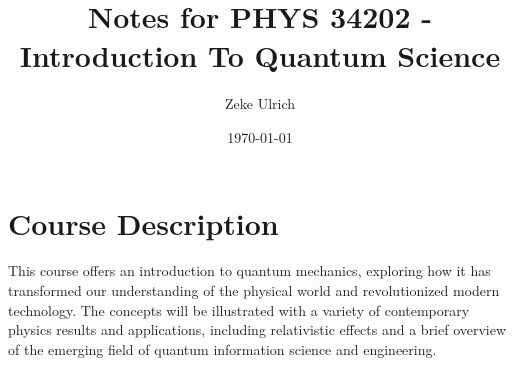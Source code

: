 \documentclass[nobib]{tufte-handout}
\title{Notes for PHYS 34202 - Introduction To Quantum Science }
\author{Zeke Ulrich}
\date{\today}
\begin{document}
\maketitle

\tableofcontents

\section{Course Description}
This course offers an introduction to quantum mechanics, 
exploring how it has transformed our understanding of the 
physical world and revolutionized modern technology. The 
concepts will be illustrated with a variety of 
contemporary physics results and applications, including 
relativistic effects and a brief overview of the emerging 
field of quantum information science and engineering.

\pagebreak



\end{document}

